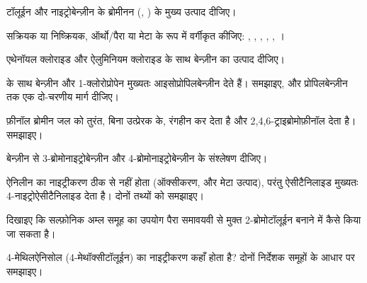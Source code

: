 \begin{exercise}[$\star$]\label{exo:b2:aromatic-substitution:2}
टॉलूईन और नाइट्रोबेन्ज़ीन के ब्रोमीनन (, ) के मुख्य उत्पाद
दीजिए।
\end{exercise}

\begin{exercise}[$\star$]\label{exo:b2:aromatic-substitution:3}
सक्रियक या निष्क्रियक, ऑर्थो/पैरा या मेटा के रूप में वर्गीकृत कीजिए: , , ,
, , ।
\end{exercise}

\begin{exercise}[$\star$]\label{exo:b2:aromatic-substitution:4}
एथेनॉयल क्लोराइड और ऐलुमिनियम क्लोराइड के साथ बेन्ज़ीन का उत्पाद दीजिए।
\end{exercise}

\begin{exercise}[$\star\star$]\label{exo:b2:aromatic-substitution:5}
 के साथ बेन्ज़ीन और 1-क्लोरोप्रोपेन मुख्यतः आइसोप्रोपिलबेन्ज़ीन देते हैं। समझाइए, और
प्रोपिलबेन्ज़ीन तक एक दो-चरणीय मार्ग दीजिए।
\end{exercise}

\begin{exercise}[$\star\star$]\label{exo:b2:aromatic-substitution:6}
फ़ीनॉल ब्रोमीन जल को तुरंत, बिना उत्प्रेरक के, रंगहीन कर देता है और
2,4,6-ट्राइब्रोमोफ़ीनॉल देता है। समझाइए।
\end{exercise}

\begin{exercise}[$\star\star$]\label{exo:b2:aromatic-substitution:7}
बेन्ज़ीन से 3-ब्रोमोनाइट्रोबेन्ज़ीन और 4-ब्रोमोनाइट्रोबेन्ज़ीन के संश्लेषण दीजिए।
\end{exercise}

\begin{exercise}[$\star\star$]\label{exo:b2:aromatic-substitution:8}
ऐनिलीन का नाइट्रीकरण ठीक से नहीं होता (ऑक्सीकरण, और मेटा उत्पाद), परंतु ऐसीटैनिलाइड मुख्यतः
4-नाइट्रोऐसीटैनिलाइड देता है। दोनों तथ्यों को समझाइए।
\end{exercise}

\begin{exercise}[$\star\star$]\label{exo:b2:aromatic-substitution:9}
दिखाइए कि सल्फ़ोनिक अम्ल समूह का उपयोग पैरा समावयवी से मुक्त 2-ब्रोमोटॉलूईन बनाने में कैसे किया जा सकता है।
\end{exercise}

\begin{exercise}[$\star\star\star$]\label{exo:b2:aromatic-substitution:10}
4-मेथिलऐनिसोल (4-मेथॉक्सीटॉलूईन) का नाइट्रीकरण कहाँ होता है? दोनों निर्देशक समूहों के आधार पर
समझाइए।
\end{exercise}

